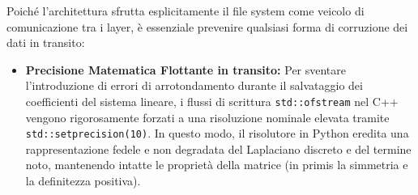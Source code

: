 \documentclass[a4paper,12pt]{article}
\begin{document}
Poiché l'architettura sfrutta esplicitamente il file system come veicolo di comunicazione tra i layer, è essenziale prevenire qualsiasi forma di corruzione dei dati in transito:
\begin{itemize}
  \item \textbf{Precisione Matematica Flottante in transito:} Per sventare l'introduzione di errori di arrotondamento durante il salvataggio dei coefficienti del sistema lineare, i flussi di scrittura \texttt{std::ofstream} nel C++ vengono rigorosamente forzati a una risoluzione nominale elevata tramite \texttt{std::setprecision(10)}. In questo modo, il risolutore in Python eredita una rappresentazione fedele e non degradata del Laplaciano discreto e del termine noto, mantenendo intatte le proprietà della matrice (in primis la simmetria e la definitezza positiva).
\end{itemize}
\end{document}
